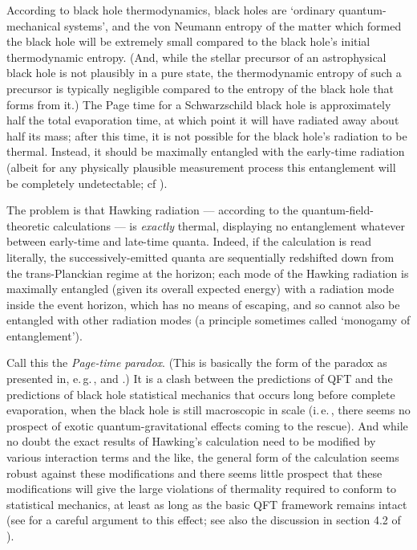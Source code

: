 \documentclass{article}
\newcommand{\iec}{\mbox{i.\,e.\,}}
\newcommand{\egc}{\mbox{e.\,g.\,}}
\begin{document}
According to black hole thermodynamics, black holes are `ordinary quantum-mechanical systems', and the von Neumann entropy of the matter which formed the black hole will be extremely small compared to the black hole's initial thermodynamic entropy. (And, while the stellar precursor of an astrophysical black hole is not plausibly in a pure state, the thermodynamic entropy of such a precursor is typically negligible compared to the entropy of the black hole that forms from it.) The Page time for a Schwarzschild black hole is approximately half the total evaporation time, at which point it will have radiated away about half its mass; after this time, it is not possible for the black hole's radiation to be thermal. Instead, it should be maximally entangled with the early-time radiation (albeit for any physically plausible measurement process this entanglement will be completely undetectable; cf ).

The problem is that Hawking radiation --- according to the quantum-field-theoretic calculations --- is \emph{exactly} thermal, displaying no entanglement whatever between early-time and late-time quanta. Indeed, if the calculation is read literally, the successively-emitted quanta are sequentially redshifted down from the trans-Planckian regime at the horizon; each mode of the Hawking radiation is maximally entangled (given its overall expected energy) with a radiation mode inside the event horizon, which has no means of escaping, and so cannot also be entangled with other radiation modes (a principle sometimes called `monogamy of entanglement').

Call this the \emph{Page-time paradox}. (This is basically the form of the paradox as presented in, \egc,  and .) It is a clash between the predictions of QFT and the predictions of black hole statistical mechanics that occurs long before complete evaporation, when the black hole is still macroscopic in scale (\iec, there seems no prospect of exotic quantum-gravitational effects coming to the rescue). And while no doubt the exact results of Hawking's calculation need to be modified by various interaction terms and the like, the general form of the calculation seems robust against these modifications and there seems little prospect that these modifications will give the large violations of thermality required to conform to statistical mechanics, at least as long as the basic QFT framework remains intact (see  for a careful argument to this effect; see also the discussion in section 4.2 of ).
\end{document}
